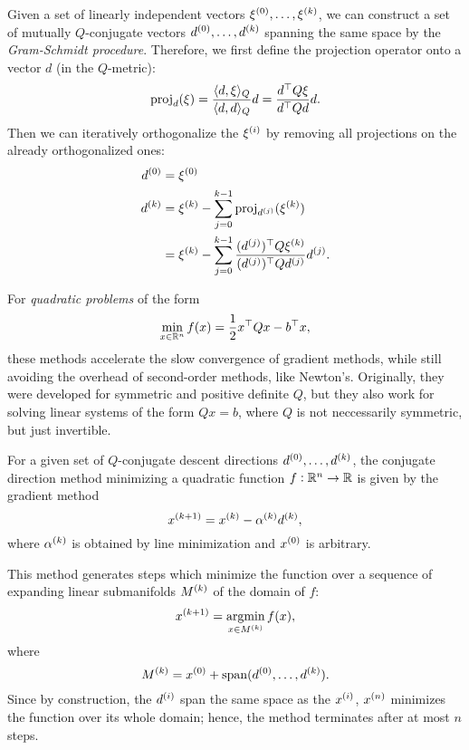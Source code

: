 \documentclass{article}
\begin{document}
Given a set of linearly independent vectors \(\kth[0]{\xi}, \ldots, \kth{\xi}\), we can construct a
set of mutually \(Q\)-conjugate vectors \(\kth[0]{d}, \ldots, \kth{d}\) spanning the same space by
the \emph{Gram-Schmidt procedure}.  Therefore, we first define the projection operator onto a vector
\(d\) (in the \(Q\)-metric):
\begin{equation*}
  \proj_d(\xi) = \frac{\langle d, \xi \rangle_Q}{\langle d, d \rangle_Q} d
  = \frac{\T{d} Q \xi}{\T{d} Q d} d.
\end{equation*}
Then we can iteratively orthogonalize the \(\kth[i]{\xi}\) by removing all projections on the already
orthogonalized ones:
\begin{align*}
  \kth[0]{d} &= \kth[0]{\xi} \\
  \kth[k]{d} &= \kth[k]{\xi} - \sum_{j=0}^{k-1} \proj_{\kth[j]{d}}(\kth[k]{\xi}) \\
             &= \kth[k]{\xi} - \sum_{j=0}^{k-1}
               \frac{\T{(\kth[j]{d})} Q \kth[k]{\xi}}{\T{(\kth[j]{d})} Q \kth[j]{d}} \kth[j]{d}.
\end{align*}



For \emph{quadratic problems} of the form
\begin{equation*}
  \min_{x \in \RR^n} f(x) = \frac{1}{2} \T{x}Qx - \T{b}x,
\end{equation*}
these methods accelerate the slow convergence of gradient methods, while still avoiding the overhead
of second-order methods, like Newton's.  Originally, they were developed for symmetric and positive
definite \(Q\), but they also work for solving linear systems of the form \(Qx = b\), where \(Q\) is
not neccessarily symmetric, but just invertible.

For a given set of \(Q\)-conjugate descent directions \(\kth[0]{d}, \ldots, \kth{d}\), the conjugate
direction method minimizing a quadratic function \(f: \RR^n \to \RR\) is given by the gradient
method
\begin{equation*}
  \kth[k+1]{x} = \kth{x} - \kth{\alpha}\kth{d},
\end{equation*}
where \(\kth{\alpha}\) is obtained by line minimization and \(\kth[0]{x}\) is arbitrary.

This method generates steps which minimize the function over a sequence of expanding linear
submanifolds \(\kth{M}\) of the domain of \(f\):
\begin{equation*}
  \kth[k+1]{x} = \argmin_{x \in \kth{M}} f(x),
\end{equation*}
where
\begin{equation*}
  \kth{M} = \kth[0]{x} + \Span (\kth[0]{d}, \ldots, \kth{d}).
\end{equation*}
Since by construction, the \(\kth[i]{d}\) span the same space as the \(\kth[i]{x}\), \(\kth[n]{x}\)
minimizes the function over its whole domain; hence, the method terminates after at most \(n\)
steps.
\end{document}
